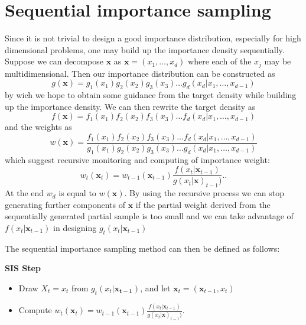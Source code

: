 \documentclass[times, utf8, diplomski]{fer}
\begin{document}
\section{Sequential importance sampling}
Since it is not trivial to design a good importance distribution, especially for high dimensional problems, one may build up the importance density sequentially. Suppose we can decompose $\mathbf{x}$ as $\mathbf{x} = (x_1, \ldots, x_d)$ where each of the $x_j$ may be multidimensional. Then our importance distribution can be constructed as 
\begin{equation*}
g(\mathbf{x}) = g_1(x_1) g_2(x_2) g_3(x_3) \ldots g_d(x_d | x_1, \ldots, x_{d - 1})
\end{equation*}
by wich we hope to obtain some guidance from the target density while building up the  importance density. We can then rewrite the target density as 
\begin{equation*}
f(\mathbf{x}) = f_1(x_1) f_2(x_2) f_3(x_3) \ldots f_d(x_d | x_1, \ldots, x_{d - 1})
\end{equation*}
and the weights as 
\begin{equation*}
w(\mathbf{x}) = \frac{f_1(x_1) f_2(x_2) f_3(x_3) \ldots f_d(x_d | x_1, \ldots, x_{d - 1})}{g_1(x_1) g_2(x_2) g_3(x_3) \ldots g_d(x_d | x_1, \ldots, x_{d - 1})}
\end{equation*}
which suggest recursive monitoring and computing of importance weight:
\begin{equation*}
w_t(\mathbf{x}_t) = w_{t - 1}(\mathbf{x}_{t - 1})\frac{f(x_t | \mathbf{x}_{t - 1})}{g(x_t | \mathbf{x})_{t - 1})}.         .
\end{equation*}
At the end $w_d$ is equal to $w(\mathbf{x})$. By using the recursive process we can stop generating further components of $\mathbf{x}$ if the partial weight derived from the sequentially generated partial sample is too small and we can take advantage of $f(x_t | \mathbf{x}_{t - 1})$ in designing $g_t(x_t | \mathbf{x}_{t - 1})$

The sequential importance sampling method can then be defined as follows:

\textbf{SIS Step}
\label{SIS_step}
\begin{itemize}
\item{Draw $X_t=x_t$ from $g_t(x_t | \mathbf{x_{t-1}})$, and let $\mathbf{x}_t = (\mathbf{x}_{t - 1}, x_t)$}
\item{
Compute $w_t(\mathbf{x}_t) = w_{t - 1}(\mathbf{x}_{t - 1})\frac{f(x_t | \mathbf{x}_{t - 1})}{g(x_t | \mathbf{x})_{t - 1})}$.
}
\end{itemize}
\end{document}
